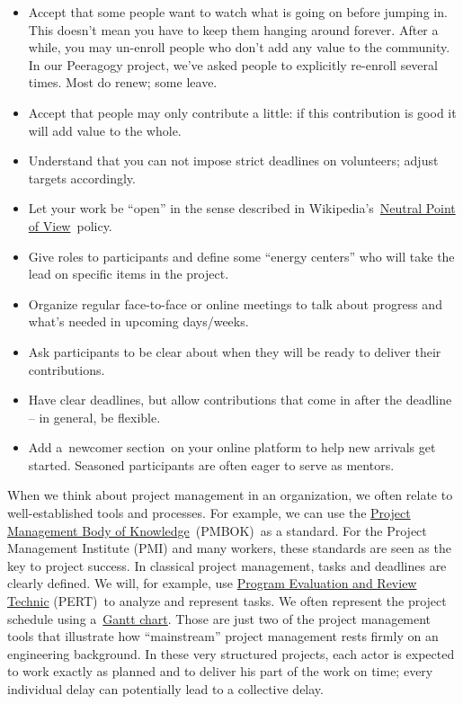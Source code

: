 \begin{itemize}
\tightlist
\item
  Accept that some people want to watch what is going on before jumping
  in. This doesn't mean you have to keep them hanging around forever.
  After a while, you may un-enroll people who don't add any value to the
  community. In our Peeragogy project, we've asked people to explicitly
  re-enroll several times. Most do renew; some leave.
\item
  Accept that people may only contribute a little: if this contribution
  is good it will add value to the whole.
\item
  Understand that you can not impose strict deadlines on volunteers;
  adjust targets accordingly.
\item
  Let your work be ``open'' in the sense described in
  Wikipedia's~\href{http://en.wikipedia.org/wiki/Wikipedia:Neutral_point_of_view}{Neutral
  Point of View}~policy.
\item
  Give roles to participants and define some ``energy centers'' who will
  take the lead on specific items in the project.
\item
  Organize regular face-to-face or online meetings to talk about
  progress and what's needed in upcoming days/weeks.
\item
  Ask participants to be clear about when they will be ready to deliver
  their contributions.
\item
  Have clear deadlines, but allow contributions that come in after the
  deadline -- in general, be flexible.
\item
  Add a~newcomer section~on your online platform to help new arrivals
  get started. Seasoned participants are often eager to serve as
  mentors.
\end{itemize}

When we think about project management in an organization, we often
relate to well-established tools and processes. For example, we can use
the \href{http://www.pmi.org/PMBOK-Guide-and-Standards.aspx}{Project
Management Body of Knowledge}~(PMBOK)~as a standard. For the Project
Management Institute (PMI) and many workers, these standards are seen as
the key to project success. In classical project management, tasks and
deadlines are clearly defined. We will, for example, use
\href{http://en.wikipedia.org/wiki/PERT}{Program Evaluation and Review
Technic} (PERT)~to analyze and represent tasks. We often represent the
project schedule using
a~\href{http://en.wikipedia.org/wiki/Gantt_chart}{Gantt chart}. Those
are just two of the project management tools that illustrate how
``mainstream'' project management rests firmly on an engineering
background. In these very structured projects, each actor is expected to
work exactly as planned and to deliver his part of the work on time;
every individual delay can potentially lead to a collective delay.

